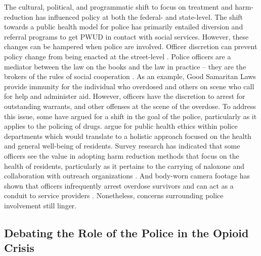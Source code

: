 The cultural, political, and programmatic shift to focus on treatment and harm-reduction has influenced policy at both the federal- and state-level. The shift towards a public health model for police has primarily entailed diversion and referral programs to get PWUD in contact with social services. However, these changes can be hampered when police are involved. Officer discretion can prevent policy change from being enacted at the street-level \parencite{friedman_intersectional_2021}. Police officers are a mediator between the law on the books and the law in practice -- they are the brokers of the rules of social cooperation \parencite{del_pozo_arrest_2022}. As an example, Good Samaritan Laws provide immunity for the individual who overdosed and others on scene who call for help and administer aid. However, officers have the discretion to arrest for outstanding warrants, and other offenses at the scene of the overdose. To address this issue, some have argued for a shift in the goal of the police, particularly as it applies to the policing of drugs. \textcite{del_pozo_beyond_2021} argue for public health ethics within police departments which would translate to a holistic approach focused on the health and general well-being of residents. Survey research has indicated that some officers see the value in adopting harm reduction methods that focus on the health of residents, particularly as it pertains to the carrying of naloxone and collaboration with outreach organizations \parencite{banta-green_police_2013, lloyd_its_2023, white_moving_2021}. And body-worn camera footage has shown that officers infrequently arrest overdose survivors and can act as a conduit to service providers \parencite{white_leveraging_2022}. Nonetheless, concerns surrounding police involvement still linger. 

\subsection{Debating the Role of the Police in the Opioid Crisis}

